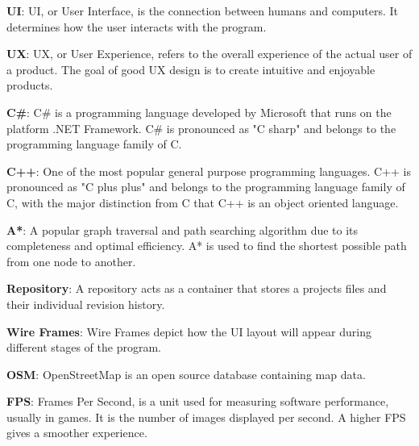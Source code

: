 \noindent
\label{itm:ui}\textbf{UI}: UI, or User Interface, is the connection between humans and computers. It determines how the user interacts with the program.

\noindent
\label{itm:ux}\textbf{UX}: UX, or User Experience, refers to the overall experience of the actual user of a product. The goal of good UX design is to create intuitive and enjoyable products.

\noindent
\label{itm:csharp}\textbf{C\#}: C\# is a programming language developed by Microsoft that runs on the platform .NET Framework. C\# is pronounced as "C sharp" and belongs to the programming language family of C.

\noindent
\label{itm:c++}\textbf{C++}: One of the most popular general purpose programming languages. C++ is pronounced as "C plus plus" and belongs to the programming language family of C, with the major distinction from C that C++ is an object oriented language.

\noindent
\label{itm:a*}\textbf{A*}: A popular graph traversal and path searching algorithm due to its completeness and optimal efficiency. A* is used to find the shortest possible path from one node to another.

\noindent
\label{itm:repository}\textbf{Repository}: A repository acts as a container that stores a projects files and their individual revision history. 

\noindent
\label{itm:wire-frame}\textbf{Wire Frames}: Wire Frames depict how the UI layout will appear during different stages of the program. 

\noindent
\label{itm:open-street-map}\textbf{OSM}: OpenStreetMap is an open source database containing map data.

\noindent
\label{itm:fps}\textbf{FPS}: Frames Per Second, is a unit used for measuring software performance, usually in games. It is the number of images displayed per second. A higher FPS gives a smoother experience.




